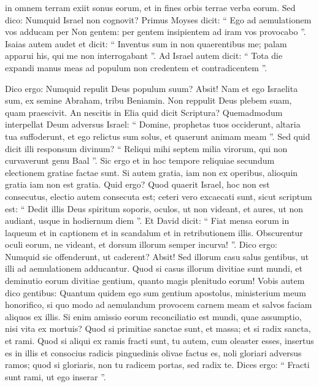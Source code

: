 \begin{biblechapter}
\begin{biblechapter}
\begin{biblechapter}
\begin{biblechapter}
\begin{biblechapter}
\begin{biblechapter}
\begin{biblechapter}
\begin{biblechapter}
\begin{biblechapter}
\begin{biblechapter}
 in omnem terram exiit sonus eorum,
 et in fines orbis terrae verba eorum.
 \verse Sed dico: Numquid Israel non cognovit? Primus Moyses dicit:
 “ Ego ad aemulationem vos adducam per Non gentem:
 per gentem insipientem ad iram vos provocabo ”.
 \verse Isaias autem audet et dicit: “ Inventus sum in non quaerentibus me; palam apparui his, qui me non interrogabant ”.
 \verse Ad Israel autem dicit: “ Tota die expandi manus meas ad populum non credentem et contradicentem ”.
 
\begin{biblechapter}
\verse Dico ergo: Numquid repulit Deus populum suum? Absit! Nam et ego Israelita sum, ex semine Abraham, tribu Beniamin. 
\verse Non reppulit Deus plebem suam, quam praescivit. An nescitis in Elia quid dicit Scriptura? Quemadmodum interpellat Deum adversus Israel: 
\verse “ Domine, prophetas tuos occiderunt, altaria tua suffoderunt, et ego relictus sum solus, et quaerunt animam meam ”.
 \verse Sed quid dicit illi responsum divinum?
 “ Reliqui mihi septem milia virorum, qui non curvaverunt genu Baal ”.
 \verse Sic ergo et in hoc tempore reliquiae secundum electionem gratiae factae sunt. \verse Si autem gratia, iam non ex operibus, alioquin gratia iam non est gratia.
 \verse Quid ergo? Quod quaerit Israel, hoc non est consecutus, electio autem consecuta est; ceteri vero excaecati sunt, 
\verse sicut scriptum est:
 “ Dedit illis Deus spiritum soporis,
 oculos, ut non videant,
 et aures, ut non audiant,
 usque in hodiernum diem ”.
 \verse Et David dicit:
 “ Fiat mensa eorum in laqueum et in captionem
 et in scandalum et in retributionem illis. 
\verse Obscurentur oculi eorum, ne videant,
 et dorsum illorum semper incurva! ”.
 \verse Dico ergo: Numquid sic offenderunt, ut caderent? Absit! Sed illorum casu salus gentibus, ut illi ad aemulationem adducantur. 
\verse Quod si casus illorum divitiae sunt mundi, et deminutio eorum divitiae gentium, quanto magis plenitudo eorum!
 \verse Vobis autem dico gentibus: Quantum quidem ego sum gentium apostolus, ministerium meum honorifico, 
\verse si quo modo ad aemulandum provocem carnem meam et salvos faciam aliquos ex illis.
 \verse Si enim amissio eorum reconciliatio est mundi, quae assumptio, nisi vita ex mortuis? 
\verse Quod si primitiae sanctae sunt, et massa; et si radix sancta, et rami. 
\verse Quod si aliqui ex ramis fracti sunt, tu autem, cum oleaster esses, insertus es in illis et consocius radicis pinguedinis olivae factus es, 
\verse noli gloriari adversus ramos; quod si gloriaris, non tu radicem portas, sed radix te.
 \verse Dices ergo: “ Fracti sunt rami, ut ego inserar ”. 

\end{biblechapter}
\end{biblechapter}
\end{biblechapter}
\end{biblechapter}
\end{biblechapter}
\end{biblechapter}
\end{biblechapter}
\end{biblechapter}
\end{biblechapter}
\end{biblechapter}
\end{biblechapter}
